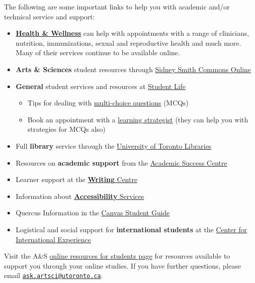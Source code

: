 \documentclass[
  openany]{book}
\begin{document}
The following are some important links to help you with academic and/or technical service and support:

\begin{itemize}
\item
  \href{https://studentlife.utoronto.ca/department/health-wellness/}{\textbf{Health \& Wellness}} can help with appointments with a range of clinicians, nutrition, immunizations, sexual and reproductive health and much more. Many of their services continue to be available online.
\item
  \textbf{Arts \& Sciences} student resources through \href{https://sidneysmithcommons.artsci.utoronto.ca/}{Sidney Smith Commons Online}
\item
  \textbf{General} student services and resources at \href{https://www.studentlife.utoronto.ca/}{Student Life}

  \begin{itemize}
  \item
    Tips for dealing with \href{https://studentlife.utoronto.ca/task/multiple-choice-tests-and-exams/}{multi-choice questions} (MCQs)
  \item
    Book an appointment with a \href{https://studentlife.utoronto.ca/service/learning-strategist-connections/}{learning strategist} (they can help you with strategies for MCQs also)
  \end{itemize}
\item
  Full \textbf{library} service through the \href{http://onesearch.library.utoronto.ca/}{University of Toronto Libraries}
\item
  Resources on \textbf{academic support} from the \href{http://www.asc.utoronto.ca/}{Academic Success Centre}
\item
  Learner support at the \href{http://www.writing.utoronto.ca/}{\textbf{Writing} Centre}
\item
  Information about \href{http://accessibility.utoronto.ca/}{\textbf{Accessibility} Services}
\item
  Quercus Information in the \href{https://community.canvaslms.com/docs/DOC-10701}{Canvas Student Guide}
\item
  Logistical and social support for \textbf{international students} at the \href{https://studentlife.utoronto.ca/cie}{Center for International Experience}
\end{itemize}

Visit the A\&S \href{https://www.artsci.utoronto.ca/current/academic-advising-and-support/online-resources-students}{online resources for students page} for resources available to support you through your online studies. If you have further questions, please email \href{mailto:ask.artsci@utoronto.ca}{\nolinkurl{ask.artsci@utoronto.ca}}.
\end{document}

